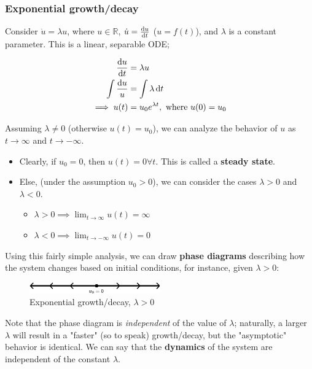 \documentclass[12pt, oneside]{article}
\begin{document}
\subsubsection{Exponential growth/decay}

Consider $\dot{u} = \lambda u$, where $u \in \mathbb{R}$, $\dot{u} = \dv{u}{t}$ ($u = f(t)$), and $\lambda$ is a constant parameter. This is a linear, separable ODE;

\begin{align*}
  \dv{u}{t} &= \lambda u\\
  \int \frac{\dd{u}}{u} &= \int \lambda \dd{t}\\
  \implies u(t) &= u_0 e^{\lambda t}, \text{ where } u(0) = u_0
\end{align*}

Assuming $\lambda \neq 0$ (otherwise $u(t) = u_0$), we can analyze the behavior of $u$ as $t \longrightarrow \infty$ and $t \longrightarrow -\infty$.

\begin{itemize}
  \item Clearly, if $u_0 = 0$, then $u(t) = 0 \forall t$. This is called a \textbf{steady state}.
  \item Else, (under the assumption $u_0 > 0$), we can consider the cases $\lambda > 0$ and $\lambda < 0$.
  \begin{itemize}
    \item $\lambda >0 \implies \lim_{t \to \infty} u(t) = \infty$
    \item $\lambda < 0 \implies \lim_{t \to -\infty} u(t) = 0$
  \end{itemize}
\end{itemize}

Using this fairly simple analysis, we can draw \textbf{phase diagrams} describing how the system changes based on initial conditions, for instance, given $\lambda > 0$:
\begin{figure}[h!]
  \centering
  \includegraphics*[width=0.5\textwidth]{figures/example1-1-1.png}
  \caption{Exponential growth/decay, $\lambda> 0$}
\end{figure}

Note that the phase diagram is \emph{independent} of the value of $\lambda$; naturally, a larger $\lambda$ will result in a "faster" (so to speak) growth/decay, but the "asymptotic" behavior is identical. We can say that the \textbf{dynamics} of the system are independent of the constant $\lambda$.
\end{document}
